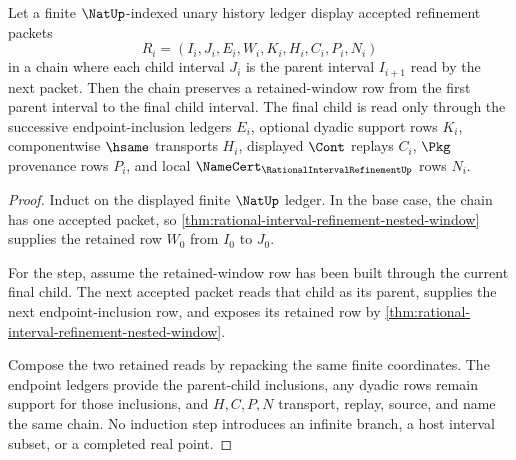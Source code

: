 \begin{theorem}
\label{thm:rational-interval-refinement-retained-window-induction}
Let a finite $\NatUp$-indexed unary history ledger display accepted refinement packets
$$
R_i=(I_i,J_i,E_i,W_i,K_i,H_i,C_i,P_i,N_i)
$$
in a chain where each child interval $J_i$ is the parent interval $I_{i+1}$ read by the next packet. Then the chain preserves a retained-window row from the first parent interval to the final child interval. The final child is read only through the successive endpoint-inclusion ledgers $E_i$, optional dyadic support rows $K_i$, componentwise $\hsame$ transports $H_i$, displayed $\Cont$ replays $C_i$, $\Pkg$ provenance rows $P_i$, and local $\NameCert_{\RationalIntervalRefinementUp}$ rows $N_i$.
\end{theorem}
\begin{proof}
Induct on the displayed finite $\NatUp$ ledger. In the base case, the chain has one accepted packet, so \autoref{thm:rational-interval-refinement-nested-window} supplies the retained row $W_0$ from $I_0$ to $J_0$.

For the step, assume the retained-window row has been built through the current final child. The next accepted packet reads that child as its parent, supplies the next endpoint-inclusion row, and exposes its retained row by \autoref{thm:rational-interval-refinement-nested-window}.

Compose the two retained reads by repacking the same finite coordinates. The endpoint ledgers provide the parent-child inclusions, any dyadic rows remain support for those inclusions, and $H,C,P,N$ transport, replay, source, and name the same chain. No induction step introduces an infinite branch, a host interval subset, or a completed real point.
\end{proof}

